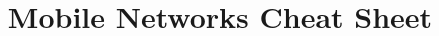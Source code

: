 \documentclass[10pt,a4paper,landscape]{article}
\begin{document}
\title{Mobile Networks Cheat Sheet}

\raggedright
\footnotesize
\sffamily
\begin{multicols*}{4}

\setlength{\premulticols}{1pt}
\setlength{\postmulticols}{1pt}
\setlength{\multicolsep}{1pt}
\setlength{\columnsep}{2pt}





\end{multicols*}
\end{document}
